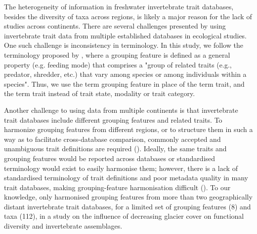 \documentclass{article}
\begin{document}
The heterogeneity of information in freshwater invertebrate trait databases, besides the diversity of taxa across regions, is likely a major reason for the lack of studies across continents. There are several challenges presented by using invertebrate trait data from multiple established databases in ecological studies. One such challenge is inconsistency in terminology. In this study, we follow the terminology proposed by \citet{schmera_proposed_2015}, where a grouping feature is defined as a general property (e.g. feeding mode) that comprises a "group of related traits (e.g., predator, shredder, etc.) that vary among species or among individuals within a species". Thus, we use the term grouping feature in place of the term trait, and the term trait instead of trait state, modality or trait category. 

Another challenge to using data from multiple continents is that invertebrate trait databases include different grouping features and related traits. To harmonize grouping features from different regions, or to structure them in such a way as to facilitate cross-database comparison, commonly accepted and unambiguous trait definitions are required (\cite{schneider_towards_2019}). Ideally, the same traits and grouping features would be reported across databases or standardised terminology would exist to easily harmonise them; however, there is a lack of standardised terminology of trait definitions and poor metadata quality in many trait databases, making grouping-feature harmonisation difficult (\cite{baird_toward_2011, kissling_towards_2018}). To our knowledge, only \citet{brown_functional_2018} harmonised grouping features from more than two geographically distant invertebrate trait databases, for a limited set of grouping features (8) and taxa (112), in a study on the influence of decreasing glacier cover on functional diversity and invertebrate assemblages.
\end{document}
